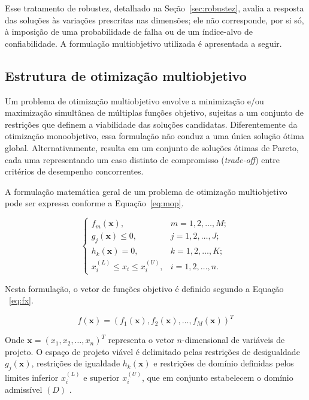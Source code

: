 Esse tratamento de robustez, detalhado na Seção~\ref{sec:robustez}, avalia a resposta das soluções às variações prescritas nas dimensões; ele não corresponde, por si só, à imposição de uma probabilidade de falha ou de um índice-alvo de confiabilidade.
A formulação multiobjetivo utilizada é apresentada a seguir.

\subsection{Estrutura de otimização multiobjetivo}\label{sec:otim_multiobjetivo}

Um problema de otimização multiobjetivo envolve a minimização e/ou maximização simultânea de múltiplas funções objetivo, sujeitas a um conjunto de restrições que definem a viabilidade das soluções candidatas.
Diferentemente da otimização monoobjetivo, essa formulação não conduz a uma única solução ótima global.
Alternativamente, resulta em um conjunto de soluções ótimas de Pareto, cada uma representando um caso distinto de compromisso (\textit{trade-off}) entre critérios de desempenho concorrentes.
 
A formulação matemática geral de um problema de otimização multiobjetivo pode ser expressa conforme a Equação~\eqref{eq:mop}.
 
\begin{equation}
\left\{
\begin{array}{ll}
f_m(\mathbf{x}), & m = 1,2,\ldots,M; \\
g_j(\mathbf{x}) \leq 0, & j = 1,2,\ldots,J; \\
h_k(\mathbf{x}) = 0, & k = 1,2,\ldots,K; \\
x_i^{(L)} \leq x_i \leq x_i^{(U)}, & i = 1,2,\ldots,n.
\end{array}
\right.
\label{eq:mop}
\end{equation}
 
 Nesta formulação, o vetor de funções objetivo é definido segundo a Equação
 ~\eqref{eq:fx}.
 
 \begin{equation}
 f(\mathbf{x}) = \left(f_1(\mathbf{x}), f_2(\mathbf{x}), \ldots, f_M(\mathbf{x})\right)^T\label{eq:fx}
 \end{equation}
 
 Onde $\mathbf{x} = (x_1, x_2, \ldots, x_n)^T$ 
representa o vetor $n$-dimensional de variáveis de projeto.
O espaço de projeto viável é delimitado pelas restrições de desigualdade $g_j(\mathbf{x})$, restrições de igualdade $h_k(\mathbf{x})$ e restrições de domínio definidas pelos limites inferior $x_i^{(L)}$ e superior $x_i^{(U)}$, que em conjunto estabelecem o domínio admissível $(D)$ \parencite{DEB2009}.

